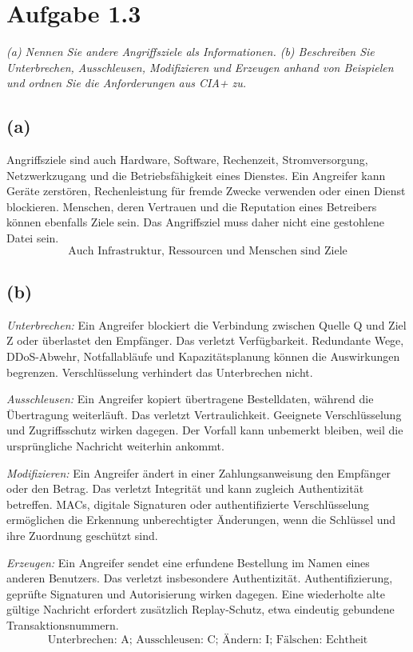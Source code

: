 \documentclass[a4paper,11pt]{article}
\newif\ifexplain
\newcommand{\aufgabe}[1]{\section*{Aufgabe #1}}
\newcommand{\angabe}[1]{\textit{#1}\par\smallskip}
\newcommand{\teil}[1]{\subsection*{(#1)}}
\newcommand{\explain}[1]{\ifexplain\begin{erklbox}#1\end{erklbox}\fi}
\newcommand{\ergebnis}[1]{\[\boxed{\text{#1}}\]}
\begin{document}
\aufgabe{1.3}
\angabe{(a) Nennen Sie andere Angriffsziele als Informationen. (b) Beschreiben Sie Unterbrechen,
Ausschleusen, Modifizieren und Erzeugen anhand von Beispielen und ordnen Sie die Anforderungen aus CIA+ zu.}
\teil{a}
Angriffsziele sind auch Hardware, Software, Rechenzeit, Stromversorgung, Netzwerkzugang und die Betriebsfähigkeit eines Dienstes.
Ein Angreifer kann Geräte zerstören, Rechenleistung für fremde Zwecke verwenden oder einen Dienst blockieren.
Menschen, deren Vertrauen und die Reputation eines Betreibers können ebenfalls Ziele sein.
Das Angriffsziel muss daher nicht eine gestohlene Datei sein.
\ergebnis{Auch Infrastruktur, Ressourcen und Menschen sind Ziele}
\explain{Wir unterscheiden den Wert, der geschädigt werden soll, von der Methode des Angriffs.
Ein blockierter Dienst verursacht Schaden, selbst wenn keine Daten gestohlen oder verändert werden.}
\teil{b}
\emph{Unterbrechen:} Ein Angreifer blockiert die Verbindung zwischen Quelle Q und Ziel Z oder überlastet den Empfänger.
Das verletzt Verfügbarkeit. Redundante Wege, DDoS-Abwehr, Notfallabläufe und Kapazitätsplanung können die Auswirkungen begrenzen.
Verschlüsselung verhindert das Unterbrechen nicht.
\explain{Der Pfeil zum Ziel kommt hier nicht mehr an. Deshalb prüfen wir zuerst die Verfügbarkeit,
nicht die Geheimhaltung. Eine sichere verschlüsselte Verbindung kann trotzdem unterbrochen werden.}

\emph{Ausschleusen:} Ein Angreifer kopiert übertragene Bestelldaten, während die Übertragung weiterläuft.
Das verletzt Vertraulichkeit. Geeignete Verschlüsselung und Zugriffsschutz wirken dagegen.
Der Vorfall kann unbemerkt bleiben, weil die ursprüngliche Nachricht weiterhin ankommt.
\explain{Beim Mitlesen fehlt dem Empfänger keine Nachricht. Daraus folgt: Ein funktionierender Dienst
ist kein Beleg für vertrauliche Kommunikation. Wir müssen die Leserechte und den Transport separat schützen.}

\emph{Modifizieren:} Ein Angreifer ändert in einer Zahlungsanweisung den Empfänger oder den Betrag.
Das verletzt Integrität und kann zugleich Authentizität betreffen.
MACs, digitale Signaturen oder authentifizierte Verschlüsselung ermöglichen die Erkennung unberechtigter Änderungen,
wenn die Schlüssel und ihre Zuordnung geschützt sind.
\explain{Eine reine Prüfsumme ist nicht genug, wenn der Angreifer sie ebenfalls ersetzen kann.
Der Nachweis muss so geschützt sein, dass er nicht zusammen mit dem Inhalt neu gefälscht werden kann.}

\emph{Erzeugen:} Ein Angreifer sendet eine erfundene Bestellung im Namen eines anderen Benutzers.
Das verletzt insbesondere Authentizität. Authentifizierung, geprüfte Signaturen und Autorisierung wirken dagegen.
Eine wiederholte alte gültige Nachricht erfordert zusätzlich Replay-Schutz, etwa eindeutig gebundene Transaktionsnummern.
\ergebnis{Unterbrechen: A; Ausschleusen: C; Ändern: I; Fälschen: Echtheit}
\explain{Die Zuordnung nennt den Schwerpunkt. In einem realen Angriff können mehrere Anforderungen
zugleich verletzt werden. Besonders das Wiederholen einer alten gültigen Nachricht zeigt, dass eine
prüfbare Herkunft noch nicht beweist, dass eine neue Transaktion gewollt ist.}
\end{document}
